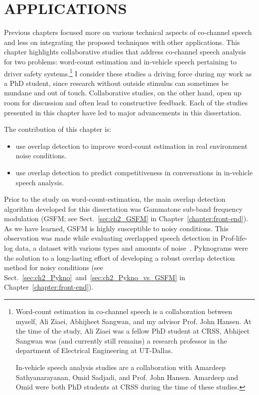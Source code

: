 \chapter{APPLICATIONS}
\label{chap:applications}

Previous chapters focused more on various technical aspects of co-channel speech and less on integrating the proposed techniques with other applications. 
This chapter highlights collaborative studies that address co-channel speech analysis for two problems: word-count estimation and in-vehicle speech pertaining to driver safety systems.\footnote{Word-count estimation in co-channel speech is a collaboration between myself, Ali Ziaei, Abhijheet Sangwan, and my advisor Prof. John Hansen. At the time of the study, Ali Ziaei was a fellow PhD student at CRSS, Abhijeet Sangwan was (and currently still remains) a research professor in the department of Electrical Engineering at UT-Dallas. 

In-vehicle speech analysis studies are a collaboration with Amardeep Sathyanarayanan, Omid Sadjadi, and Prof. John Hansen. Amardeep and Omid were both PhD students at CRSS during the time of these studies.} 
I consider these studies a driving force during my work as a PhD student, since research without outside stimulus can sometimes be mundane and out of touch. 
Collaborative studies, on the other hand, open up room for discussion and often lead to constructive feedback. 
Each of the studies presented in this chapter have led to major advancements in this dissertation. 

The contribution of this chapter is:
\begin{itemize}
	\item use overlap detection to improve word-count estimation in real environment noise conditions. 
	\item use overlap detection to predict competitiveness in conversations in in-vehicle speech analysis. 
\end{itemize}
Prior to the study on word-count-estimation, the main overlap detection algorithm developed for this dissertation was Gammatone sub-band frequency modulation (GSFM; see Sect.~\ref{sec:ch2_GSFM} in Chapter~\ref{chapter:front-end}). As we have learned, GSFM is highly susceptible to noisy conditions. 
This observation was made while evaluating overlapped speech detection in Prof-life-log data, a dataset with various types and amounts of noise~\cite{ziaei2013prof}. 
Pyknograms were the solution to a long-lasting effort of developing a robust overlap detection method for noisy conditions (see Sect.~\ref{sec:ch2_Pykno}~and~\ref{sec:ch2_Pykno_vs_GSFM} in Chapter~\ref{chapter:front-end}). 

